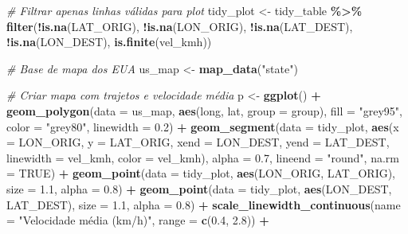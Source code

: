 \documentclass[
]{article}
\newenvironment{Shaded}{\begin{snugshade}}{\end{snugshade}}
\newcommand{\AttributeTok}[1]{\textcolor[rgb]{0.13,0.29,0.53}{#1}}
\newcommand{\CommentTok}[1]{\textcolor[rgb]{0.56,0.35,0.01}{\textit{#1}}}
\newcommand{\ConstantTok}[1]{\textcolor[rgb]{0.56,0.35,0.01}{#1}}
\newcommand{\FloatTok}[1]{\textcolor[rgb]{0.00,0.00,0.81}{#1}}
\newcommand{\FunctionTok}[1]{\textcolor[rgb]{0.13,0.29,0.53}{\textbf{#1}}}
\newcommand{\NormalTok}[1]{#1}
\newcommand{\OtherTok}[1]{\textcolor[rgb]{0.56,0.35,0.01}{#1}}
\newcommand{\SpecialCharTok}[1]{\textcolor[rgb]{0.81,0.36,0.00}{\textbf{#1}}}
\newcommand{\StringTok}[1]{\textcolor[rgb]{0.31,0.60,0.02}{#1}}
\begin{document}
\begin{Shaded}
\begin{Highlighting}[]
  \CommentTok{\# Filtrar apenas linhas válidas para plot}
\NormalTok{  tidy\_plot }\OtherTok{\textless{}{-}}\NormalTok{ tidy\_table }\SpecialCharTok{\%\textgreater{}\%}
    \FunctionTok{filter}\NormalTok{(}\SpecialCharTok{!}\FunctionTok{is.na}\NormalTok{(LAT\_ORIG), }\SpecialCharTok{!}\FunctionTok{is.na}\NormalTok{(LON\_ORIG),}
           \SpecialCharTok{!}\FunctionTok{is.na}\NormalTok{(LAT\_DEST), }\SpecialCharTok{!}\FunctionTok{is.na}\NormalTok{(LON\_DEST),}
           \FunctionTok{is.finite}\NormalTok{(vel\_kmh))}
  
  \CommentTok{\# Base de mapa dos EUA}
\NormalTok{  us\_map }\OtherTok{\textless{}{-}} \FunctionTok{map\_data}\NormalTok{(}\StringTok{"state"}\NormalTok{)}
  
  \CommentTok{\# Criar mapa com trajetos e velocidade média}
\NormalTok{  p }\OtherTok{\textless{}{-}} \FunctionTok{ggplot}\NormalTok{() }\SpecialCharTok{+}
    \FunctionTok{geom\_polygon}\NormalTok{(}\AttributeTok{data =}\NormalTok{ us\_map, }\FunctionTok{aes}\NormalTok{(long, lat, }\AttributeTok{group =}\NormalTok{ group),}
                 \AttributeTok{fill =} \StringTok{"grey95"}\NormalTok{, }\AttributeTok{color =} \StringTok{"grey80"}\NormalTok{, }\AttributeTok{linewidth =} \FloatTok{0.2}\NormalTok{) }\SpecialCharTok{+}
    \FunctionTok{geom\_segment}\NormalTok{(}\AttributeTok{data =}\NormalTok{ tidy\_plot,}
                 \FunctionTok{aes}\NormalTok{(}\AttributeTok{x =}\NormalTok{ LON\_ORIG, }\AttributeTok{y =}\NormalTok{ LAT\_ORIG, }\AttributeTok{xend =}\NormalTok{ LON\_DEST, }\AttributeTok{yend =}\NormalTok{ LAT\_DEST,}
                     \AttributeTok{linewidth =}\NormalTok{ vel\_kmh, }\AttributeTok{color =}\NormalTok{ vel\_kmh),}
                 \AttributeTok{alpha =} \FloatTok{0.7}\NormalTok{, }\AttributeTok{lineend =} \StringTok{"round"}\NormalTok{, }\AttributeTok{na.rm =} \ConstantTok{TRUE}\NormalTok{) }\SpecialCharTok{+}
    \FunctionTok{geom\_point}\NormalTok{(}\AttributeTok{data =}\NormalTok{ tidy\_plot, }\FunctionTok{aes}\NormalTok{(LON\_ORIG, LAT\_ORIG), }\AttributeTok{size =} \FloatTok{1.1}\NormalTok{, }\AttributeTok{alpha =} \FloatTok{0.8}\NormalTok{) }\SpecialCharTok{+}
    \FunctionTok{geom\_point}\NormalTok{(}\AttributeTok{data =}\NormalTok{ tidy\_plot, }\FunctionTok{aes}\NormalTok{(LON\_DEST, LAT\_DEST), }\AttributeTok{size =} \FloatTok{1.1}\NormalTok{, }\AttributeTok{alpha =} \FloatTok{0.8}\NormalTok{) }\SpecialCharTok{+}
    \FunctionTok{scale\_linewidth\_continuous}\NormalTok{(}\AttributeTok{name =} \StringTok{"Velocidade média (km/h)"}\NormalTok{, }\AttributeTok{range =} \FunctionTok{c}\NormalTok{(}\FloatTok{0.4}\NormalTok{, }\FloatTok{2.8}\NormalTok{)) }\SpecialCharTok{+}

\end{Highlighting}
\end{Shaded}
\end{document}
